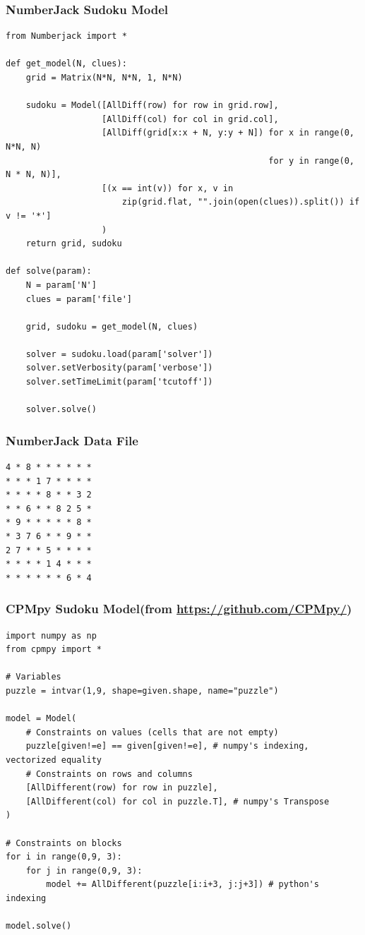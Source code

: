 \begin{frame}[fragile]
\frametitle{NumberJack Sudoku Model}
\label{sudoku:numberjack}
\tiny
\begin{verbatim}
from Numberjack import *

def get_model(N, clues):
    grid = Matrix(N*N, N*N, 1, N*N)

    sudoku = Model([AllDiff(row) for row in grid.row],
                   [AllDiff(col) for col in grid.col],
                   [AllDiff(grid[x:x + N, y:y + N]) for x in range(0, N*N, N) 
                                                    for y in range(0, N * N, N)],
                   [(x == int(v)) for x, v in 
                       zip(grid.flat, "".join(open(clues)).split()) if v != '*']
                   )
    return grid, sudoku

def solve(param):
    N = param['N']
    clues = param['file']

    grid, sudoku = get_model(N, clues)

    solver = sudoku.load(param['solver'])
    solver.setVerbosity(param['verbose'])
    solver.setTimeLimit(param['tcutoff'])

    solver.solve()
\end{verbatim}
\end{frame}

\begin{frame}[fragile]
\frametitle{NumberJack Data File}
\tiny
\begin{verbatim}
4 * 8 * * * * * *
* * * 1 7 * * * *
* * * * 8 * * 3 2
* * 6 * * 8 2 5 *
* 9 * * * * * 8 *
* 3 7 6 * * 9 * *
2 7 * * 5 * * * *
* * * * 1 4 * * *
* * * * * * 6 * 4
\end{verbatim}
\hyperlink{sudoku:continue}{}
\end{frame}



\begin{frame}[fragile]
\frametitle{CPMpy Sudoku Model{\small(from \url{https://github.com/CPMpy/})}}
\label{sudoku:cpmpy}
\tiny
\begin{verbatim}
import numpy as np
from cpmpy import *

# Variables
puzzle = intvar(1,9, shape=given.shape, name="puzzle")

model = Model(
    # Constraints on values (cells that are not empty)
    puzzle[given!=e] == given[given!=e], # numpy's indexing, vectorized equality
    # Constraints on rows and columns
    [AllDifferent(row) for row in puzzle],
    [AllDifferent(col) for col in puzzle.T], # numpy's Transpose
)

# Constraints on blocks
for i in range(0,9, 3):
    for j in range(0,9, 3):
        model += AllDifferent(puzzle[i:i+3, j:j+3]) # python's indexing

model.solve()
\end{verbatim}
\end{frame}

